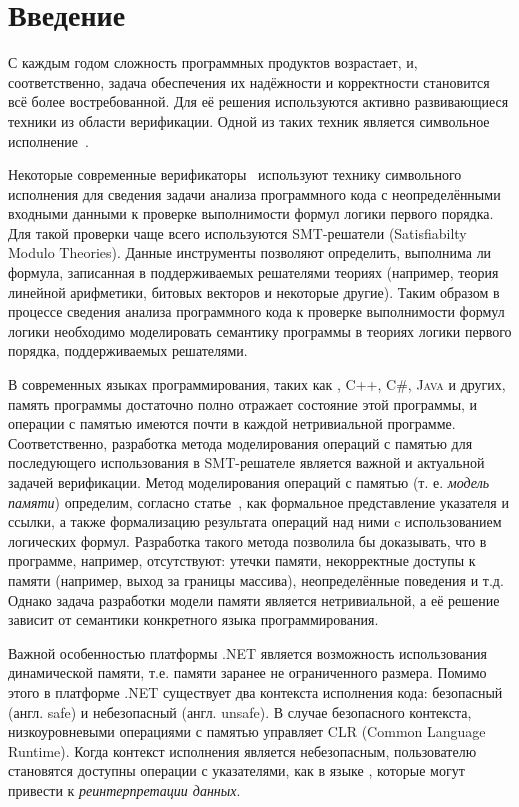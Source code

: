\section{Введение}
С каждым годом сложность программных продуктов возрастает, и, соответственно, задача обеспечения их надёжности и корректности становится всё более востребованной. Для её решения используются активно развивающиеся техники из области верификации. Одной из таких техник является символьное исполнение~\cite{wenenhancing, li2014symbolic}.

Некоторые современные верификаторы~\cite{sethu2018systems, wang2017dependence, sharma2018veritesting} используют технику символьного исполнения для сведения задачи анализа программного кода с неопределёнными входными данными к проверке выполнимости формул логики первого порядка. Для такой проверки чаще всего используются SMT-решатели (Satisfiabilty Modulo Theories). Данные инструменты позволяют определить, выполнима ли формула, записанная в поддерживаемых
решателями теориях (например, теория линейной арифметики, битовых векторов и некоторые другие). Таким образом в процессе сведения анализа программного кода к проверке выполнимости формул логики необходимо моделировать семантику программы в теориях логики первого порядка, поддерживаемых решателями.

В современных языках программирования, таких как \clang{}, \textsc{C++}, \textsc{C\#}, \textsc{Java} и других, память программы достаточно полно отражает состояние этой программы, и операции с памятью имеются почти в каждой нетривиальной программе. Соответственно, разработка метода моделирования операций с памятью для последующего использования в SMT-решателе является важной и актуальной задачей верификации. Метод моделирования операций с памятью (т. е. \emph{модель памяти}) определим, согласно статье~\cite{mandrik}, как формальное представление указателя и ссылки, а также формализацию результата операций над ними c использованием логических формул. Разработка такого метода позволила бы доказывать, что в программе, например, отсутствуют: утечки памяти, некорректные доступы к памяти (например, выход за границы массива), неопределённые поведения и т.д. Однако задача разработки модели памяти является нетривиальной, а её решение зависит от семантики конкретного языка программирования.

Важной особенностью платформы .NET является возможность использования динамической памяти, т.е. памяти заранее не ограниченного размера. Помимо этого в платформе .NET существует два контекста исполнения кода: безопасный (англ. safe) и небезопасный (англ. unsafe). В случае безопасного контекста, низкоуровневыми операциями с памятью управляет \textsc{CLR} (Common Language Runtime). Когда контекст исполнения является небезопасным, пользователю становятся доступны операции с указателями, как в языке \clang{}, которые могут привести к \emph{реинтерпретации данных}.

